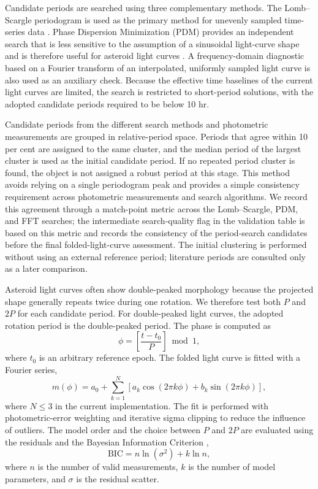 \documentclass[referee]{raa}
\begin{document}
Candidate periods are searched using three complementary methods. The Lomb--Scargle periodogram is used as the primary method for unevenly sampled time-series data \citep{Lomb1976,Scargle1982}. Phase Dispersion Minimization (PDM) provides an independent search that is less sensitive to the assumption of a sinusoidal light-curve shape and is therefore useful for asteroid light curves \citep{Stellingwerf1978,Warner2009}. A frequency-domain diagnostic based on a Fourier transform of an interpolated, uniformly sampled light curve is also used as an auxiliary check. Because the effective time baselines of the current light curves are limited, the search is restricted to short-period solutions, with the adopted candidate periods required to be below 10 hr.

Candidate periods from the different search methods and photometric measurements are grouped in relative-period space. Periods that agree within 10 per cent are assigned to the same cluster, and the median period of the largest cluster is used as the initial candidate period. If no repeated period cluster is found, the object is not assigned a robust period at this stage. This method avoids relying on a single periodogram peak and provides a simple consistency requirement across photometric measurements and search algorithms. We record this agreement through a match-point metric across the Lomb--Scargle, PDM, and FFT searches; the intermediate search-quality flag in the validation table is based on this metric and records the consistency of the period-search candidates before the final folded-light-curve assessment. The initial clustering is performed without using an external reference period; literature periods are consulted only as a later comparison.

Asteroid light curves often show double-peaked morphology because the projected shape generally repeats twice during one rotation. We therefore test both \(P\) and \(2P\) for each candidate period. For double-peaked light curves, the adopted rotation period is the double-peaked period. The phase is computed as
\begin{equation}
\phi = \left[\frac{t-t_0}{P}\right]\bmod 1 ,
\end{equation}
where \(t_0\) is an arbitrary reference epoch. The folded light curve is fitted with a Fourier series,
\begin{equation}
m(\phi)=a_0+\sum_{k=1}^{N}\left[a_k\cos(2\pi k\phi)+b_k\sin(2\pi k\phi)\right],
\end{equation}
where \(N\leq3\) in the current implementation. The fit is performed with photometric-error weighting and iterative sigma clipping to reduce the influence of outliers. The model order and the choice between \(P\) and \(2P\) are evaluated using the residuals and the Bayesian Information Criterion \citep{Schwarz1978},
\begin{equation}
\mathrm{BIC}=n\ln(\sigma^2)+k\ln n ,
\end{equation}
where \(n\) is the number of valid measurements, \(k\) is the number of model parameters, and \(\sigma\) is the residual scatter.
\end{document}
